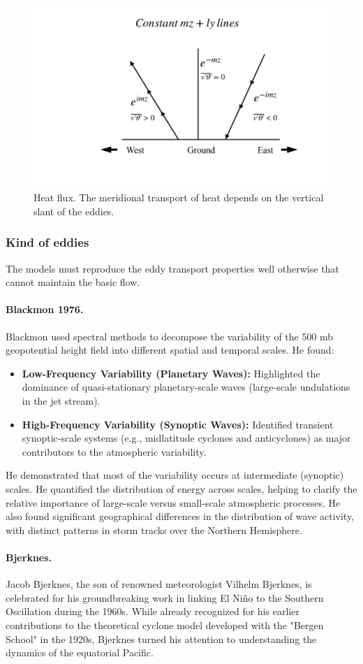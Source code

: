 \begin{figure}[h!]
	\centering
	\includegraphics[width=0.5\linewidth]{uploads/Screenshot 2024-11-24 185505.png}
	\caption{Heat flux. The meridional transport of heat depends on the vertical slant of the eddies.}
	\label{fig:enter-label}
\end{figure}
\subsubsection{Kind of eddies}
The models must reproduce the eddy transport properties well otherwise that cannot maintain the basic flow.
\paragraph{Blackmon 1976.}\cite{Black76} Blackmon used spectral methods to decompose the variability of the 500 mb geopotential height field into different spatial and temporal scales. He found:
\begin{itemize}
	\item \textbf{Low-Frequency Variability (Planetary Waves):} Highlighted the dominance of quasi-stationary planetary-scale waves (large-scale undulations in the jet stream).
	\item \textbf{High-Frequency Variability (Synoptic Waves):} Identified transient synoptic-scale systems (e.g., midlatitude cyclones and anticyclones) as major contributors to the atmospheric variability.
\end{itemize}
He demonstrated that most of the variability occurs at intermediate (synoptic) scales. He quantified the distribution of energy across scales, helping to clarify the relative importance of large-scale versus small-scale atmospheric processes. He also found significant geographical differences in the distribution of wave activity, with distinct patterns in storm tracks over the Northern Hemisphere.

\paragraph{Bjerknes.} Jacob Bjerknes, the son of renowned meteorologist Vilhelm Bjerknes, is celebrated for his groundbreaking work in linking El Niño to the Southern Oscillation during the 1960s. While already recognized for his earlier contributions to the theoretical cyclone model developed with the "Bergen School" in the 1920s, Bjerknes turned his attention to understanding the dynamics of the equatorial Pacific.

